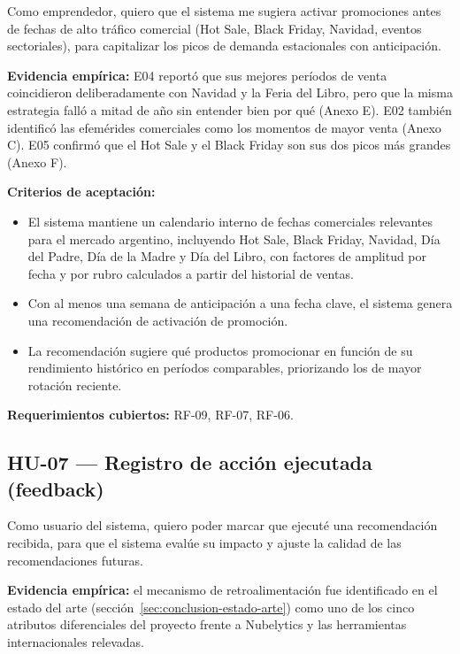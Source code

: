 Como emprendedor, quiero que el sistema me sugiera activar promociones antes de fechas de alto tráfico comercial (Hot Sale, Black Friday, Navidad, eventos sectoriales), para capitalizar los picos de demanda estacionales con anticipación.

\noindent\textbf{Evidencia empírica:} E04 reportó que sus mejores períodos de venta coincidieron deliberadamente con Navidad y la Feria del Libro, pero que la misma estrategia falló a mitad de año sin entender bien por qué (Anexo E). E02 también identificó las efemérides comerciales como los momentos de mayor venta (Anexo C). E05 confirmó que el Hot Sale y el Black Friday son sus dos picos más grandes (Anexo F).

\noindent\textbf{Criterios de aceptación:}
\begin{itemize}
    \item El sistema mantiene un calendario interno de fechas comerciales relevantes para el mercado argentino, incluyendo Hot Sale, Black Friday, Navidad, Día del Padre, Día de la Madre y Día del Libro, con factores de amplitud por fecha y por rubro calculados a partir del historial de ventas.
    \item Con al menos una semana de anticipación a una fecha clave, el sistema genera una recomendación de activación de promoción.
    \item La recomendación sugiere qué productos promocionar en función de su rendimiento histórico en períodos comparables, priorizando los de mayor rotación reciente.
\end{itemize}

\noindent\textbf{Requerimientos cubiertos:} RF-09, RF-07, RF-06.

\subsection{HU-07 --- Registro de acción ejecutada (feedback)}
\label{sec:hu-07}

Como usuario del sistema, quiero poder marcar que ejecuté una recomendación recibida, para que el sistema evalúe su impacto y ajuste la calidad de las recomendaciones futuras.

\noindent\textbf{Evidencia empírica:} el mecanismo de retroalimentación fue identificado en el estado del arte (sección~\ref{sec:conclusion-estado-arte}) como uno de los cinco atributos diferenciales del proyecto frente a Nubelytics y las herramientas internacionales relevadas.

